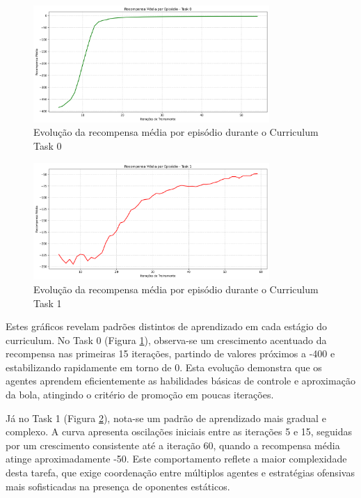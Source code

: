 \begin{figure}[H]
    \centering
    \includegraphics[width=0.8\textwidth]{fig/graficos_trabalho/graficos_experimentos/geral/recompensa_media_curriculum_task_0.png}
    \caption{Evolução da recompensa média por episódio durante o Curriculum Task 0}
    \label{fig:reward_task0}
\end{figure}

\begin{figure}[H]
    \centering
    \includegraphics[width=0.8\textwidth]{fig/graficos_trabalho/graficos_experimentos/geral/recompensa_media_curriculum_task_1.png}
    \caption{Evolução da recompensa média por episódio durante o Curriculum Task 1}
    \label{fig:reward_task1}
\end{figure}

Estes gráficos revelam padrões distintos de aprendizado em cada estágio do curriculum. No Task 0 (Figura \ref{fig:reward_task0}), observa-se um crescimento acentuado da recompensa nas primeiras 15 iterações, partindo de valores próximos a -400 e estabilizando rapidamente em torno de 0. Esta evolução demonstra que os agentes aprendem eficientemente as habilidades básicas de controle e aproximação da bola, atingindo o critério de promoção em poucas iterações.

Já no Task 1 (Figura \ref{fig:reward_task1}), nota-se um padrão de aprendizado mais gradual e complexo. A curva apresenta oscilações iniciais entre as iterações 5 e 15, seguidas por um crescimento consistente até a iteração 60, quando a recompensa média atinge aproximadamente -50. Este comportamento reflete a maior complexidade desta tarefa, que exige coordenação entre múltiplos agentes e estratégias ofensivas mais sofisticadas na presença de oponentes estáticos.

